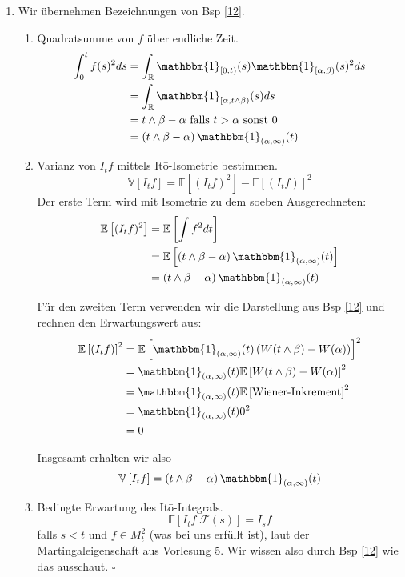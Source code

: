 \documentclass[a4paper,11pt,notitlepage,fullpage]{article}
\newcommand{\E}{\mathbb E}
\newcommand{\V}{\mathbb V}
\newcommand{\ind}{\mathbbm{1}}
\begin{document}
\begin{enumerate}
\item Wir übernehmen Bezeichnungen von Bsp \ref{12}.
\begin{enumerate}
\item Quadratsumme von $f$ über endliche Zeit.
\begin{align*}
\int_0^t f(s)^2 ds &= \int_{\mathbb{R}} \ind_{[0, t)}(s) \ind_{[\alpha, \beta)} (s)^2 ds\\
&= \int_{\mathbb{R}} \ind_{[\alpha, t\wedge\beta)}(s) ds\\
&= t\wedge\beta - \alpha \text{ falls } t>\alpha \text{ sonst } 0\\
&= \left(t\wedge\beta - \alpha\right) \ind_{(\alpha, \infty)}(t)
\end{align*}

\item Varianz von $I_t f$ mittels Itō-Isometrie bestimmen.
$$\V\left[ I_t f\right] = \E\left[ (I_t f)^2 \right] - \E\left[ (I_t f) \right]^2$$
Der erste Term wird mit Isometrie zu dem soeben Ausgerechneten:
\begin{align*}
\E\left[ (I_t f)^2 \right] &= \E\left[ \int f^2 dt \right]\\
&= \E\left[\left(t\wedge\beta - \alpha\right)\ind_{(\alpha, \infty)}(t)\right]\\
&= \left(t\wedge\beta - \alpha\right)\ind_{(\alpha, \infty)}(t)
\end{align*}

Für den zweiten Term verwenden wir die Darstellung aus Bsp \ref{12} und rechnen den Erwartungswert aus:
\begin{align*}
\E\left[ (I_t f) \right]^2 &= \E\left[ \ind_{(\alpha, \infty)}(t) \left( W(t\wedge\beta) - W(\alpha) \right)\right]^2\\
&= \ind_{(\alpha, \infty)}(t) \E\left[ W(t\wedge\beta) - W(\alpha)\right]^2\\
&= \ind_{(\alpha, \infty)}(t) \E\left[ \text{Wiener-Inkrement}\right]^2\\
&= \ind_{(\alpha, \infty)}(t) 0^2\\
&= 0
\end{align*}

Insgesamt erhalten wir also
$$\V\left[ I_t f\right] = \left(t\wedge\beta - \alpha\right)\ind_{(\alpha, \infty)}(t)$$

\item Bedingte Erwartung des Itō-Integrals.
$$\E \left[ I_t f | \mathcal{F}(s)\right] = I_s f$$
falls $s<t$ und $f\in M_t^2$ (was bei uns erfüllt ist), laut der Martingaleigenschaft aus Vorlesung 5. Wir wissen also durch Bsp \ref{12} wie das ausschaut.
\hfill $\square$


\end{enumerate}
\end{enumerate}
\end{document}
